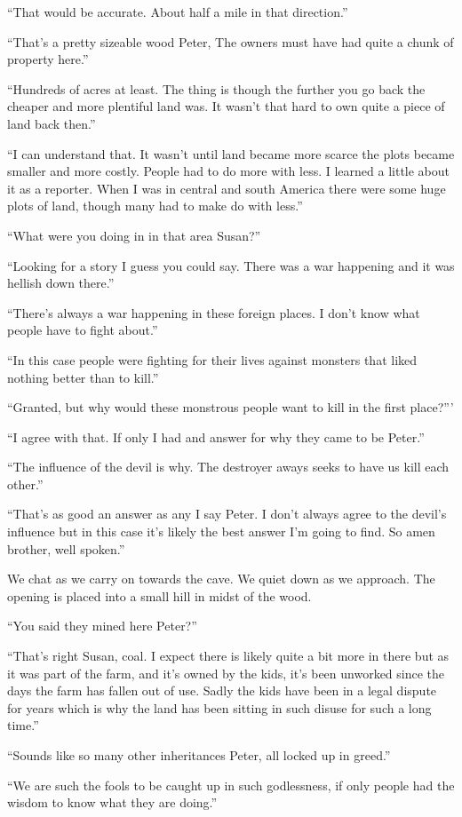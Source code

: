 ``That would be accurate. About half a mile in that direction.''

``That's a pretty sizeable wood Peter, The owners must have had quite a chunk of property here.''

``Hundreds of acres at least. The thing is though the further you go back the cheaper and more plentiful land was. It wasn't that hard to own quite a piece of land back then.''

``I can understand that. It wasn't until land became more scarce the plots became smaller and more costly. People had to do more with less. I learned a little about it as a reporter. When I was in central and south America there were some huge plots of land, though many had to make do with less.''

``What were you doing in in that area Susan?''

``Looking for a story I guess you could say. There was a war happening and it was hellish down there.''

``There's always a war happening in these foreign places. I don't know what people have to fight about.''

``In this case people were fighting for their lives against monsters that liked nothing better than to kill.''

``Granted, but why would these monstrous people want to kill in the first place?'''

``I agree with that. If only I had and answer for why they came to be Peter.''

``The influence of the devil is why. The destroyer aways seeks to have us kill each other.''

``That's as good an answer as any I say Peter. I don't always agree to the devil's influence but in this case it's likely the best answer I'm going to find. So amen brother, well spoken.''

We chat as we carry on towards the cave. We quiet down as we approach. The opening is placed into a small hill in midst of the wood.

``You said they mined here Peter?''

``That's right Susan, coal. I expect there is likely quite a bit more in there but as it was part of the farm, and it's owned by the kids, it's been unworked since the days the farm has fallen out of use. Sadly the kids have been in a legal dispute for years which is why the land has been sitting in such disuse for such a long time.''

``Sounds like so many other inheritances Peter, all locked up in greed.''

``We are such the fools to be caught up in such godlessness, if only people had the wisdom to know what they are doing.''



